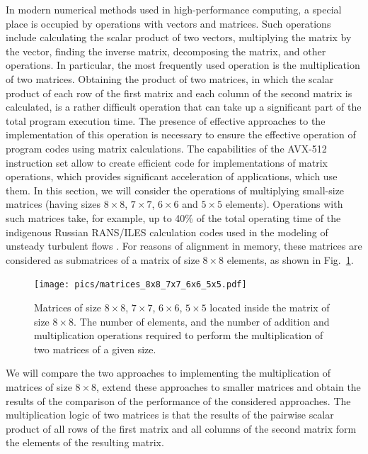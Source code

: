 \documentclass[
11pt,%
tightenlines,%
twoside,%
onecolumn,%
nofloats,%
nobibnotes,%
nofootinbib,%
superscriptaddress,%
noshowpacs,%
centertags]%
{revtex4}
\begin{document}
In modern numerical methods used in high-performance computing, a special place is occupied by operations with vectors and matrices.
Such operations include calculating the scalar product of two vectors, multiplying the matrix by the vector, finding the inverse matrix, decomposing the matrix, and other operations.
In particular, the most frequently used operation is the multiplication of two matrices.
Obtaining the product of two matrices, in which the scalar product of each row of the first matrix and each column of the second matrix is calculated, is a rather difficult operation that can take up a significant part of the total program execution time.
The presence of effective approaches to the implementation of this operation is necessary to ensure the effective operation of program codes using matrix calculations.
The capabilities of the AVX-512 instruction set allow to create efficient code for implementations of matrix operations, which provides significant acceleration of applications, which use them.
In this section, we will consider the operations of multiplying small-size matrices (having sizes $8 \times 8$, $7 \times 7$, $6 \times 6$ and $5 \times 5$ elements).
Operations with such matrices take, for example, up to 40\% of the total operating time of the indigenous Russian RANS/ILES calculation codes used in the modeling of unsteady turbulent flows \cite{Lyub_RANS_ILES, Ben_Lyub_Chest_RANS_ILES}.
For reasons of alignment in memory, these matrices are considered as submatrices of a matrix of size $8 \times 8$ elements, as shown in Fig.~\ref{fig:matrices_8x8_7x7_6x6_5x5}.

\begin{figure}[h]
\setcaptionmargin{5mm}
\onelinecaptionsfalse %
\texttt{[image: pics/matrices\_8x8\_7x7\_6x6\_5x5.pdf]}
\caption{Matrices of size $8 \times 8$, $7 \times 7$, $6 \times 6$, $5 \times 5$ located inside the matrix of size $8 \times 8$. The number of elements, and the number of addition and multiplication operations required to perform the multiplication of two matrices of a given size.}\label{fig:matrices_8x8_7x7_6x6_5x5}
\end{figure}

We will compare the two approaches to implementing the multiplication of matrices of size $8 \times 8$, extend these approaches to smaller matrices and obtain the results of the comparison of the performance of the considered approaches.
The multiplication logic of two matrices is that the results of the pairwise scalar product of all rows of the first matrix and all columns of the second matrix form the elements of the resulting matrix.
\end{document}
